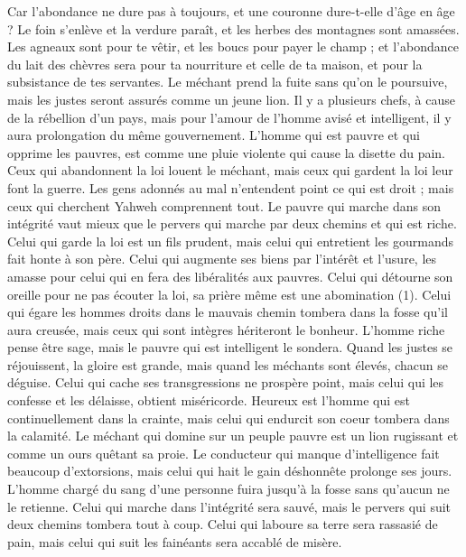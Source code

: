 \begin{multicols}{2}
Car l’abondance ne dure pas à toujours, et une couronne  dure-t-elle d'âge en âge ?
Le foin s’enlève et la verdure paraît, et les herbes des montagnes sont amassées.
Les agneaux sont pour te vêtir, et les boucs pour payer le champ ;
et l'abondance du lait des chèvres sera pour ta nourriture et celle de ta maison, et pour la subsistance de tes servantes.
\VerseOne{}Le méchant prend la fuite sans qu'on le poursuive, mais les justes seront assurés comme un jeune lion.
Il y a plusieurs chefs, à cause de la rébellion d’un pays, mais pour l'amour de l'homme avisé et intelligent, il y aura prolongation du même gouvernement.
L'homme qui est pauvre et qui opprime les pauvres, est comme une pluie violente qui cause la disette du pain.
Ceux qui abandonnent la loi louent le méchant, mais ceux qui gardent la loi leur font la guerre.
Les gens adonnés au mal n'entendent point ce qui est droit ; mais ceux qui cherchent Yahweh comprennent tout.
Le pauvre qui marche dans son intégrité vaut mieux que le pervers qui marche par deux chemins et qui est riche.
Celui qui garde la loi est un fils prudent, mais celui qui entretient les gourmands fait honte à son père.
Celui qui augmente ses biens par l’intérêt et l’usure, les amasse pour celui qui en fera des libéralités aux pauvres.
Celui qui détourne son oreille pour ne pas écouter la loi, sa prière même est une abomination (1).
Celui qui égare les hommes droits dans le mauvais chemin tombera dans la fosse qu'il aura creusée, mais ceux qui sont intègres hériteront le bonheur.
L'homme riche pense être sage, mais le pauvre qui est intelligent le sondera.
Quand les justes se réjouissent, la gloire est grande, mais quand les méchants sont élevés, chacun se déguise.
Celui qui cache ses transgressions ne prospère point, mais celui qui les confesse et les délaisse, obtient miséricorde.
Heureux est l'homme qui est continuellement dans la crainte, mais celui qui endurcit son coeur tombera dans la calamité.
Le méchant qui domine sur un peuple pauvre est un lion rugissant et comme un ours quêtant sa proie.
Le conducteur qui manque d'intelligence fait beaucoup d'extorsions, mais celui qui hait le gain déshonnête prolonge ses jours.
L'homme chargé du sang d'une personne fuira jusqu'à la fosse sans qu'aucun ne le retienne.
Celui qui marche dans l'intégrité sera sauvé, mais le pervers qui suit deux chemins tombera tout à coup.
Celui qui laboure sa terre sera rassasié de pain, mais celui qui suit les fainéants sera accablé de misère.

\end{multicols}
